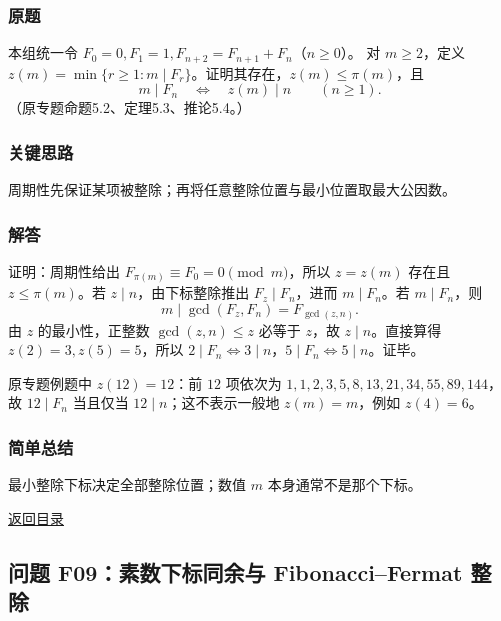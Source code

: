 \documentclass[11pt,a4paper]{article}
\begin{document}
\subsubsection{原题}\label{ux539fux9898-40}

本组统一令 \(F_0=0,F_1=1,F_{n+2}=F_{n+1}+F_n\)（\(n\ge0\)）。 对
\(m\ge2\)，定义
\(z(m)=\min\{r\ge1:m\mid F_r\}\)。证明其存在，\(z(m)\le\pi(m)\)，且
\[m\mid F_n\quad\Longleftrightarrow\quad z(m)\mid n\qquad(n\ge1).\]
（原专题命题5.2、定理5.3、推论5.4。）

\subsubsection{关键思路}\label{ux5173ux952eux601dux8def-40}

周期性先保证某项被整除；再将任意整除位置与最小位置取最大公因数。

\subsubsection{解答}\label{ux89e3ux7b54-40}

证明：周期性给出 \(F_{\pi(m)}\equiv F_0=0\pmod m\)，所以 \(z=z(m)\)
存在且 \(z\le\pi(m)\)。若 \(z\mid n\)，由下标整除推出
\(F_z\mid F_n\)，进而 \(m\mid F_n\)。若 \(m\mid F_n\)，则
\[m\mid\gcd(F_z,F_n)=F_{\gcd(z,n)}.\] 由 \(z\) 的最小性，正整数
\(\gcd(z,n)\le z\) 必等于 \(z\)，故 \(z\mid n\)。直接算得
\(z(2)=3,z(5)=5\)，所以
\(2\mid F_n\Leftrightarrow3\mid n\)，\(5\mid F_n\Leftrightarrow5\mid n\)。证毕。

原专题例题中 \(z(12)=12\)：前 \(12\) 项依次为
\(1,1,2,3,5,8,13,21,34,55,89,144\)，故 \(12\mid F_n\) 当且仅当
\(12\mid n\)；这不表示一般地 \(z(m)=m\)，例如 \(z(4)=6\)。

\subsubsection{简单总结}\label{ux7b80ux5355ux603bux7ed3-40}

最小整除下标决定全部整除位置；数值 \(m\) 本身通常不是那个下标。

\noindent\hyperref[contents]{返回目录}

\subsection{问题 F09：素数下标同余与 Fibonacci--Fermat
整除}\label{ux95eeux9898-f09ux7d20ux6570ux4e0bux6807ux540cux4f59ux4e0e-fibonaccifermat-ux6574ux9664}
\end{document}
